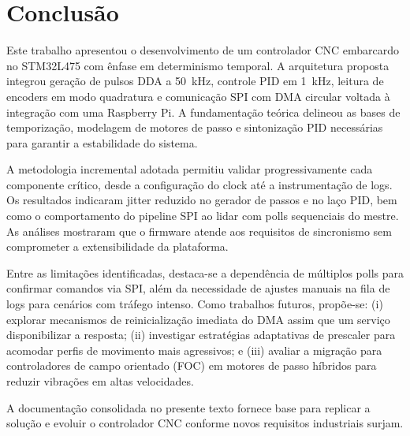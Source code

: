 \chapter{Conclusão}\label{cap:conclusao}

Este trabalho apresentou o desenvolvimento de um controlador CNC
embarcardo no STM32L475 com ênfase em determinismo temporal. A
arquitetura proposta integrou geração de pulsos DDA a
\SI{50}{\kilo\hertz}, controle PID em \SI{1}{\kilo\hertz}, leitura de
encoders em modo quadratura e comunicação SPI com DMA circular voltada à
integração com uma Raspberry Pi. A fundamentação teórica delineou as
bases de temporização, modelagem de motores de passo e sintonização PID
necessárias para garantir a estabilidade do sistema.

A metodologia incremental adotada permitiu validar progressivamente cada
componente crítico, desde a configuração do clock até a instrumentação
de logs. Os resultados indicaram jitter reduzido no gerador de passos e
no laço PID, bem como o comportamento do pipeline SPI ao lidar com polls
sequenciais do mestre. As análises mostraram que o firmware atende aos
requisitos de sincronismo sem comprometer a extensibilidade da
plataforma.

Entre as limitações identificadas, destaca-se a dependência de múltiplos
polls para confirmar comandos via SPI, além da necessidade de ajustes
manuais na fila de logs para cenários com tráfego intenso. Como trabalhos
futuros, propõe-se: (i) explorar mecanismos de reinicialização imediata
do DMA assim que um serviço disponibilizar a resposta; (ii) investigar
estratégias adaptativas de prescaler para acomodar perfis de movimento
mais agressivos; e (iii) avaliar a migração para controladores de campo
orientado (FOC) em motores de passo híbridos para reduzir vibrações em
altas velocidades.

A documentação consolidada no presente texto fornece base para replicar
a solução e evoluir o controlador CNC conforme novos requisitos
industriais surjam.

